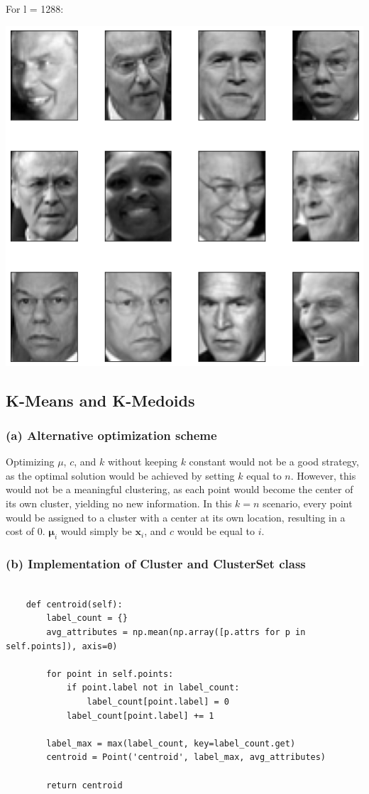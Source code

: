 \documentclass[11pt]{article}
\newcommand{\sol}[1]{{\bf{\color{magenta}{{Solution:}}}}}
\begin{document}
For l = 1288:
\begin{center}
    \includegraphics[scale=0.6]{1c-6.png}
\end{center}

\subsection{K-Means and K-Medoids}
\subsubsection{(a) Alternative optimization scheme}
\sol x Optimizing $\mu$, $c$, and $k$ without keeping $k$ constant would not be a good strategy, as the optimal solution would be achieved by setting $k$ equal to $n$. However, this would not be a meaningful clustering, as each point would become the center of its own cluster, yielding no new information. In this $k = n$ scenario, every point would be assigned to a cluster with a center at its own location, resulting in a cost of 0. $\boldsymbol{\mu}_i$ would simply be $\mathbf{x}_i$, and $c$ would be equal to $i$.

\subsubsection{(b) Implementation of Cluster and ClusterSet class}
\sol x
\begin{verbatim}

    def centroid(self):
        label_count = {}
        avg_attributes = np.mean(np.array([p.attrs for p in self.points]), axis=0)

        for point in self.points:
            if point.label not in label_count:
                label_count[point.label] = 0
            label_count[point.label] += 1

        label_max = max(label_count, key=label_count.get)
        centroid = Point('centroid', label_max, avg_attributes)

        return centroid
        
\end{verbatim}
\end{document}
